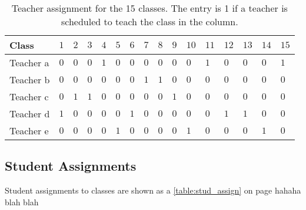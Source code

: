 \documentclass[11pt]{article}
\begin{document}
\begin{table}[h!]
\begin{tabular}{|a||l|l|l|l|l|l|l|l|l|l|l|l|l|l|l|} \hline
{}Class & $1$ & $2$ & $3$ & $4$ & $5$ & $6$ &
$7$ & $8$ & $9$ & $10$ & $11$ & $12$ & $13$ &
$14$ & $15$ \\ \hline \hline
Teacher a & $0$ & $0$ & $0$ & $1$ & $0$ & $0$
& $0$ & $0$ & $0$ & $0$ & $1$ & $0$ & $0$
& $0$ & $1$ \\ \hline
Teacher b & $0$ & $0$ & $0$ & $0$ & $0$ & $0$
& $1$ & $1$ & $0$ & $0$ & $0$ & $0$ & $0$
& $0$ & $0$ \\ \hline
Teacher c & $0$ & $1$ & $1$ & $0$ & $0$ & $0$
& $0$ & $0$ & $1$ & $0$ & $0$ & $0$ & $0$
& $0$ & $0$ \\ \hline
Teacher d & $1$ & $0$ & $0$ & $0$ & $0$ & $1$
& $0$ & $0$ & $0$ & $0$ & $0$ & $1$ & $1$
& $0$ & $0$ \\ \hline
Teacher e & $0$ & $0$ & $0$ & $0$ & $1$ & $0$
& $0$ & $0$ & $0$ & $1$ & $0$ & $0$ & $0$
& $1$ & $0$ \\ \hline
\end{tabular}
\caption{Teacher assignment for the 15 classes. The entry is 1 if a teacher is scheduled to teach the class in the column.}
\label{table:teacher_assign}
\end{table}

\FloatBarrier
\subsection{Student Assignments}
Student assignments to classes are shown as a \ref{table:stud_assign} on page \pageref{table:stud_assign} hahaha blah blah
\end{document}
